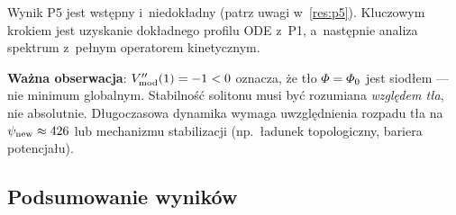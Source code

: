 \begin{problem}%
\label{prob:stabilnosc-M3}
Wynik P5 jest wstępny i~niedokładny (patrz uwagi w~\ref{res:p5}).
Kluczowym krokiem jest uzyskanie dokładnego profilu ODE z~P1,
a~następnie analiza spektrum z~pełnym operatorem kinetycznym.

\textbf{Ważna obserwacja}: $V''_{\rm mod}(1) = -1 < 0$ oznacza, że
tło $\varPhi = \varPhi_0$ jest siodłem — nie minimum globalnym.
Stabilność solitonu musi być rozumiana \emph{względem tła},
nie absolutnie. Długoczasowa dynamika wymaga uwzględnienia
rozpadu tła na $\psi_{\rm new} \approx 426$ lub mechani\-zmu
stabilizacji (np.\ ładunek topologiczny, bariera potencjału).
\end{problem}

\subsection{Podsumowanie wyników}%
\label{app:I-podsumowanie}

